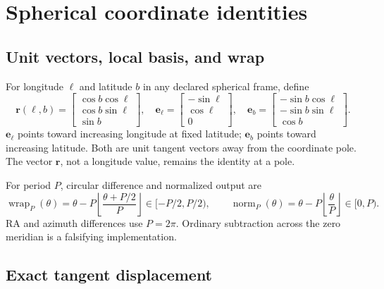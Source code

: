 \documentclass[11pt]{article}
\begin{document}
\section{Spherical coordinate identities}

\subsection{Unit vectors, local basis, and wrap}

For longitude $\ell$ and latitude $b$ in any declared spherical frame, define
\begin{equation}
 \boldsymbol r(\ell,b)=
 \begin{bmatrix}\cos b\cos\ell\\ \cos b\sin\ell\\ \sin b\end{bmatrix},
 \quad
 \boldsymbol e_{\ell}=\begin{bmatrix}-\sin\ell\\\cos\ell\\0\end{bmatrix},
 \quad
 \boldsymbol e_b=
 \begin{bmatrix}-\sin b\cos\ell\\-\sin b\sin\ell\\\cos b\end{bmatrix}.
 \label{eq:unit-vector}
\end{equation}
$\boldsymbol e_{\ell}$ points toward increasing longitude at fixed latitude;
$\boldsymbol e_b$ points toward increasing latitude.  Both are unit tangent
vectors away from the coordinate pole.  The vector $\boldsymbol r$, not a
longitude value, remains the identity at a pole.

For period $P$, circular difference and normalized output are
\begin{equation}
 \operatorname{wrap}_P(\theta)=
 \theta-P\left\lfloor\frac{\theta+P/2}{P}\right\rfloor\in[-P/2,P/2),
 \qquad
 \operatorname{norm}_P(\theta)=\theta-P\left\lfloor\frac{\theta}{P}\right\rfloor
 \in[0,P).
 \label{eq:wrap}
\end{equation}
RA and azimuth differences use $P=2\pi$.  Ordinary subtraction across the
zero meridian is a falsifying implementation.

\subsection{Exact tangent displacement}
\end{document}
